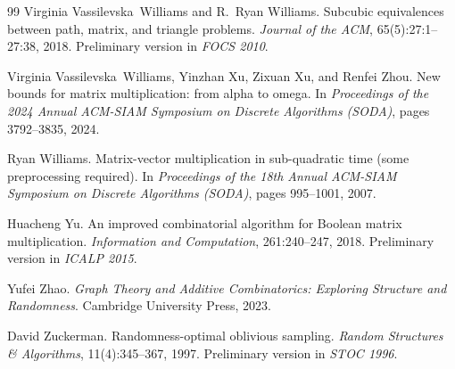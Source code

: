 \documentclass[11pt]{article}
\theoremstyle{definition}
\begin{document}
\begin{thebibliography}{99}
Virginia Vassilevska~Williams and R.~Ryan Williams.
\newblock Subcubic equivalences between path, matrix, and triangle problems.
\newblock \emph{Journal of the ACM}, 65(5):27:1--27:38, 2018.
\newblock Preliminary version in \emph{FOCS 2010}.

Virginia Vassilevska~Williams, Yinzhan Xu, Zixuan Xu, and Renfei Zhou.
\newblock New bounds for matrix multiplication: from alpha to omega.
\newblock In \emph{Proceedings of the 2024 Annual ACM-SIAM Symposium on Discrete Algorithms (SODA)}, pages 3792--3835, 2024.

Ryan Williams.
\newblock Matrix-vector multiplication in sub-quadratic time (some preprocessing required).
\newblock In \emph{Proceedings of the 18th Annual ACM-SIAM Symposium on Discrete Algorithms (SODA)}, pages 995--1001, 2007.

Huacheng Yu.
\newblock An improved combinatorial algorithm for Boolean matrix multiplication.
\newblock \emph{Information and Computation}, 261:240--247, 2018.
\newblock Preliminary version in \emph{ICALP 2015}.

Yufei Zhao.
\newblock \emph{Graph Theory and Additive Combinatorics: Exploring Structure and Randomness}.
\newblock Cambridge University Press, 2023.

David Zuckerman.
\newblock Randomness-optimal oblivious sampling.
\newblock \emph{Random Structures \& Algorithms}, 11(4):345--367, 1997.
\newblock Preliminary version in \emph{STOC 1996}.

\end{thebibliography}
\end{document}
